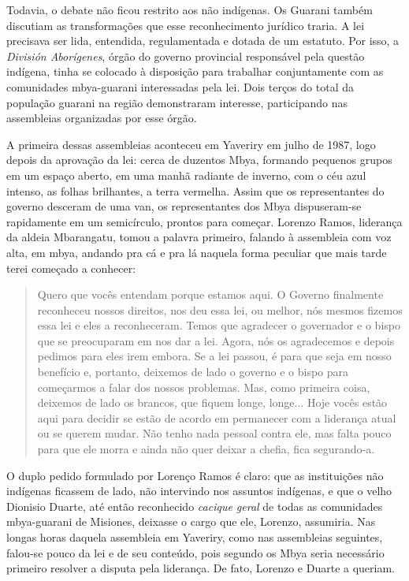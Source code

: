 Todavia, o debate não ficou restrito aos não indígenas. Os Guarani
também discutiam as transformações que esse reconhecimento jurídico
traria. A lei precisava ser lida, entendida, regulamentada e dotada de
um estatuto. Por isso, a \emph{División Aborígenes}, órgão do governo
provincial responsável pela questão indígena, tinha se colocado à
disposição para trabalhar conjuntamente com as comunidades mbya-guarani
interessadas pela lei. Dois terços do total da população guarani na
região demonstraram interesse, participando nas assembleias organizadas
por esse órgão.

A primeira dessas assembleias aconteceu em Yaveriry em julho de 1987,
logo depois da aprovação da lei: cerca de duzentos Mbya, formando
pequenos grupos em um espaço aberto, em uma manhã radiante de inverno,
com o céu azul intenso, as folhas brilhantes, a terra vermelha. Assim
que os representantes do governo desceram de uma van, os representantes
dos Mbya dispuseram-se rapidamente em um semicírculo, prontos para
começar. Lorenzo Ramos, liderança da aldeia Mbarangatu, tomou a palavra
primeiro, falando à assembleia com voz alta, em mbya, andando pra cá e
pra lá naquela forma peculiar que mais tarde terei começado a conhecer:

\begin{quote}
Quero que vocês entendam porque estamos aqui. O Governo finalmente
reconheceu nossos direitos, nos deu essa lei, ou melhor, nós mesmos
fizemos essa lei e eles a reconheceram. Temos que agradecer o governador
e o bispo que se preocuparam em nos dar a lei. Agora, nós os agradecemos
e depois pedimos para eles irem embora. Se a lei passou, é para que seja
em nosso benefício e, portanto, deixemos de lado o governo e o bispo
para começarmos a falar dos nossos problemas. Mas, como primeira coisa,
deixemos de lado os brancos, que fiquem longe, longe... Hoje vocês estão
aqui para decidir se estão de acordo em permanecer com a liderança atual
ou se querem mudar. Não tenho nada pessoal contra ele, mas falta pouco
para que ele morra e ainda não quer deixar a chefia, fica segurando-a.
\end{quote}

O duplo pedido formulado por Lorenço Ramos é claro: que as instituições
não indígenas ficassem de lado, não intervindo nos assuntos indígenas, e
que o velho Dionisio Duarte, até então reconhecido \emph{cacique geral}
de todas as comunidades mbya-guarani de Misiones, deixasse o cargo que
ele, Lorenzo, assumiria. Nas longas horas daquela assembleia em
Yaveriry, como nas assembleias seguintes, falou-se pouco da lei e de seu
conteúdo, pois segundo os Mbya seria necessário primeiro resolver a
disputa pela liderança. De fato, Lorenzo e Duarte a queriam.

